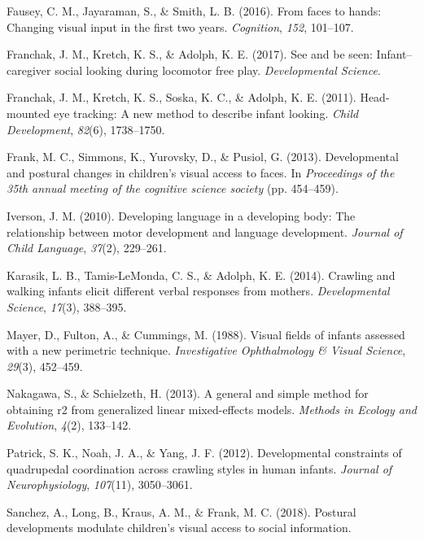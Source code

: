 \documentclass[english,man]{apa6}
\begin{document}
\hypertarget{ref-fausey2016}{}
Fausey, C. M., Jayaraman, S., \& Smith, L. B. (2016). From faces to
hands: Changing visual input in the first two years. \emph{Cognition},
\emph{152}, 101--107.

\hypertarget{ref-franchak2017see}{}
Franchak, J. M., Kretch, K. S., \& Adolph, K. E. (2017). See and be
seen: Infant--caregiver social looking during locomotor free play.
\emph{Developmental Science}.

\hypertarget{ref-franchak2011}{}
Franchak, J. M., Kretch, K. S., Soska, K. C., \& Adolph, K. E. (2011).
Head-mounted eye tracking: A new method to describe infant looking.
\emph{Child Development}, \emph{82}(6), 1738--1750.

\hypertarget{ref-frank2013}{}
Frank, M. C., Simmons, K., Yurovsky, D., \& Pusiol, G. (2013).
Developmental and postural changes in children's visual access to faces.
In \emph{Proceedings of the 35th annual meeting of the cognitive science
society} (pp. 454--459).

\hypertarget{ref-iverson2010}{}
Iverson, J. M. (2010). Developing language in a developing body: The
relationship between motor development and language development.
\emph{Journal of Child Language}, \emph{37}(2), 229--261.

\hypertarget{ref-karasik2014}{}
Karasik, L. B., Tamis-LeMonda, C. S., \& Adolph, K. E. (2014). Crawling
and walking infants elicit different verbal responses from mothers.
\emph{Developmental Science}, \emph{17}(3), 388--395.

\hypertarget{ref-mayer1988}{}
Mayer, D., Fulton, A., \& Cummings, M. (1988). Visual fields of infants
assessed with a new perimetric technique. \emph{Investigative
Ophthalmology \& Visual Science}, \emph{29}(3), 452--459.

\hypertarget{ref-nakagawa2013general}{}
Nakagawa, S., \& Schielzeth, H. (2013). A general and simple method for
obtaining r2 from generalized linear mixed-effects models. \emph{Methods
in Ecology and Evolution}, \emph{4}(2), 133--142.

\hypertarget{ref-patrick2012developmental}{}
Patrick, S. K., Noah, J. A., \& Yang, J. F. (2012). Developmental
constraints of quadrupedal coordination across crawling styles in human
infants. \emph{Journal of Neurophysiology}, \emph{107}(11), 3050--3061.

\hypertarget{ref-sanchez2018postural}{}
Sanchez, A., Long, B., Kraus, A. M., \& Frank, M. C. (2018). Postural
developments modulate children's visual access to social information.
\end{document}
